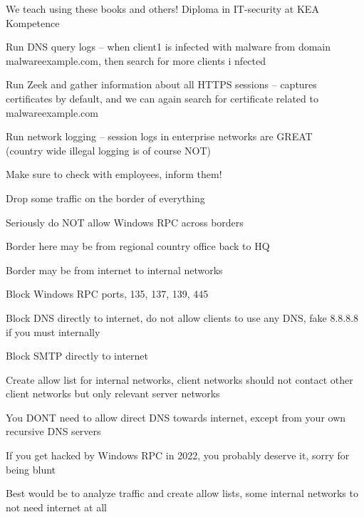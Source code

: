 \documentclass[Screen16to9,17pt]{foils}
\begin{document}
We teach using these books and others! Diploma in IT-security at KEA Kompetence\\




\begin{list2}
\item Run DNS query logs -- when client1 is infected with malware from domain malwareexample.com, then search for more clients i
nfected
\item Run Zeek and gather information about all HTTPS sessions -- captures certificates by default, and we can again search for
certificate related to malwareexample.com
\item Run network logging -- session logs in enterprise networks are GREAT \\
(country wide illegal logging is of course NOT)
\end{list2}

Make sure to check with employees, inform them!


\begin{list2}
\item Drop some traffic on the border of everything
\item Seriously do NOT allow Windows RPC across borders
\item Border here may be from regional country office back to HQ
\item Border may be from internet to internal networks
\item Block Windows RPC ports, 135, 137, 139, 445
\item Block DNS directly to internet, do not allow clients to use any DNS, fake 8.8.8.8 if you must internally
\item Block SMTP directly to internet
\item Create allow list for internal networks, client networks should not contact other client networks but only relevant server networks
\end{list2}

You DONT need to allow direct DNS towards internet, except from your own recursive DNS servers

If you get hacked by Windows RPC in 2022, you probably deserve it, sorry for being blunt

Best would be to analyze traffic and create allow lists, some internal networks to not need internet at all
\end{document}
